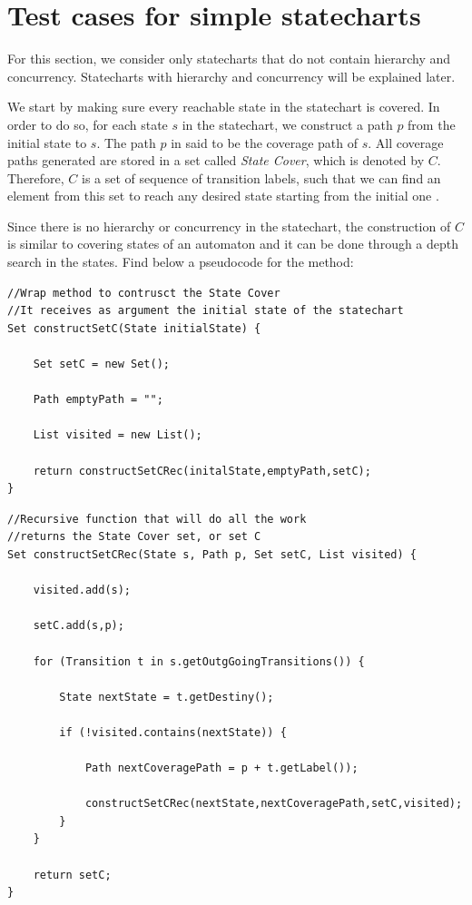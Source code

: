 \section{Test cases for simple statecharts}
\label{testSimpeState}

For this section, we consider only statecharts that do not contain hierarchy and concurrency. Statecharts with hierarchy and concurrency will be explained later.


We start by making sure every reachable state in the statechart is covered. In order to do so, for each state $s$ in the statechart, we construct a path $p$ from the initial state to $s$. The path $p$ in said to be the coverage path of $s$. All coverage paths generated are stored in a set called \textit{State Cover}, which is denoted by $C$. Therefore, $C$ is a set of sequence of transition labels, such that we can find an element from this set to reach any desired state starting from the initial one \cite{bogdanov}.

Since there is no hierarchy or concurrency in the statechart, the construction of $C$ is similar to covering states of an automaton and it can be done through a depth search in the states. Find below a pseudocode for the method:

\begin{lstlisting}
//Wrap method to contrusct the State Cover
//It receives as argument the initial state of the statechart
Set constructSetC(State initialState) {
	
	Set setC = new Set();

	Path emptyPath = "";

	List visited = new List();

	return constructSetCRec(initalState,emptyPath,setC);
}
\end{lstlisting}


\begin{lstlisting}
//Recursive function that will do all the work
//returns the State Cover set, or set C
Set constructSetCRec(State s, Path p, Set setC, List visited) {

	visited.add(s);

	setC.add(s,p);
	
	for (Transition t in s.getOutgGoingTransitions()) {
		
		State nextState = t.getDestiny();

		if (!visited.contains(nextState)) {

			Path nextCoveragePath = p + t.getLabel());

			constructSetCRec(nextState,nextCoveragePath,setC,visited);		
		}
	}
	
	return setC;
}

\end{lstlisting}

